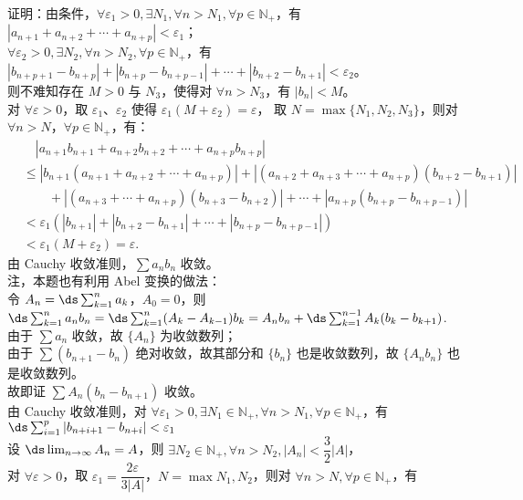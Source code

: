 \documentclass{ctexart}
\begin{document}
\begin{enumerate}
    证明：由条件，$\forall \varepsilon_1 > 0, \exists N_1, \forall n > N_1, \forall p \in \mathbb{N}_+$，有 $|a_{n+1} + a_{n+2} + \cdots + a_{n+p}| < \varepsilon_1$；\\
    $\forall \varepsilon_2 > 0, \exists N_2, \forall n > N_2, \forall p \in \mathbb{N}_+$，有 $|b_{n+p+1}-b_{n+p}|+|b_{n+p}-b_{n+p-1}|+\cdots+|b_{n+2}-b_{n+1}| < \varepsilon_2$。\\
    则不难知存在 $M>0$ 与 $N_3$，使得对 $\forall n > N_3$，有 $|b_{n}| < M$。\\
    对 $\forall\varepsilon > 0$，取 $\varepsilon_1$、$\varepsilon_2$ 使得 $\varepsilon_1(M+\varepsilon_2)=\varepsilon$，
    取 $N = \max\{N_1, N_2, N_3\}$，则对 $\forall n > N$，$\forall p \in \mathbb{N}_+$，有：
    \begin{align*}
    &\quad|a_{n+1}b_{n+1} + a_{n+2}b_{n+2} + \cdots + a_{n+p}b_{n+p}| \\
    &\leq |b_{n+1}(a_{n+1} + a_{n+2} + \cdots + a_{n+p})| + |(a_{n+2}+a_{n+3}+\cdots+a_{n+p})(b_{n+2} - b_{n+1})| \\
        &\quad\quad + |(a_{n+3}+\cdots+a_{n+p})(b_{n+3} - b_{n+2})| + \cdots + |a_{n+p}(b_{n+p} - b_{n+p-1})| \\
    &< \varepsilon_1(|b_{n+1}|+|b_{n+2}-b_{n+1}|+\cdots+|b_{n+p}-b_{n+p-1}|) \\
    &< \varepsilon_1(M+\varepsilon_2) = \varepsilon.
    \end{align*}
    由 Cauchy 收敛准则，$\sum a_n b_n$ 收敛。\\
    注，本题也有利用 Abel 变换的做法： \\
    令 $A_n=\ds\sum_{k=1}^na_k$，$A_0=0$，则 $\ds\sum_{k=1}^na_nb_n=\ds\sum_{k=1}^n(A_k-A_{k-1})b_k=A_nb_n+\ds\sum_{k=1}^{n-1}A_k(b_k-b_{k+1})$. \\
    由于 $\sum a_n$ 收敛，故 $\{A_n\}$ 为收敛数列； \\
    由于 $\sum (b_{n+1}-b_n)$ 绝对收敛，故其部分和 $\{b_n\}$ 也是收敛数列，故 $\{A_n b_n\}$ 也是收敛数列。\\
    故即证 $\sum A_n(b_n-b_{n+1})$ 收敛。 \\
    由 Cauchy 收敛准则，对 $\forall \varepsilon_1>0,\exists N_1\in\mathbb{N}_+,\forall n>N_1,\forall p\in\mathbb{N}_+$，有 $\ds\sum_{i=1}^p|b_{n+i+1}-b_{n+i}|<\varepsilon_1$ \\
    设 $\ds\lim_{n\to\infty}A_n=A$，则 $\exists N_2\in\mathbb{N}_+,\forall n>N_2, |A_n|<\dfrac{3}{2}|A|$， \\
    对 $\forall \varepsilon>0$，取 $\varepsilon_1=\dfrac{2\varepsilon}{3|A|}$，$N=\max{N_1,N_2}$，则对 $\forall n>N, \forall p\in\mathbb{N}_+$，有 \\

\end{enumerate}
\end{document}
